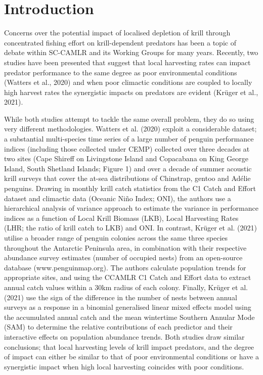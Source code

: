 \documentclass[]{elsarticle} %
\begin{document}
\hypertarget{introduction}{%
\section{Introduction}\label{introduction}}

Concerns over the potential impact of localised depletion of krill
through concentrated fishing effort on krill-dependent predators has
been a topic of debate within SC-CAMLR and its Working Groups for many
years. Recently, two studies have been presented that suggest that local
harvesting rates can impact predator performance to the same degree as
poor environmental conditions (Watters et al., 2020) and when poor
climactic conditions are coupled to locally high harvest rates the
synergistic impacts on predators are evident (Krüger et al., 2021).

While both studies attempt to tackle the same overall problem, they do
so using very different methodologies. Watters et al. (2020) exploit a
considerable dataset; a substantial multi-species time series of a large
number of penguin performance indices (including those collected under
CEMP) collected over three decades at two sites (Cape Shireff on
Livingstone Island and Copacabana on King George Island, South Shetland
Islands; Figure 1) and over a decade of summer acoustic krill surveys
that cover the at-sea distributions of Chinstrap, gentoo and Adélie
penguins. Drawing in monthly krill catch statistics from the C1 Catch
and Effort dataset and climactic data (Oceanic Niño Index; ONI), the
authors use a hierarchical analysis of variance approach to estimate the
variance in performance indices as a function of Local Krill Biomass
(LKB), Local Harvesting Rates (LHR; the ratio of krill catch to LKB) and
ONI. In contrast, Krüger et al. (2021) utilise a broader range of
penguin colonies across the same three species throughout the Antarctic
Peninsula area, in combination with their respective abundance survey
estimates (number of occupied nests) from an open-source database
(www.penguinmap.org). The authors calculate population trends for
appropriate sites, and using the CCAMLR C1 Catch and Effort data to
extract annual catch values within a 30km radius of each colony.
Finally, Krüger et al. (2021) use the sign of the difference in the
number of nests between annual surveys as a response in a binomial
generalised linear mixed effects model using the accumulated annual
catch and the mean wintertime Southern Annular Mode (SAM) to determine
the relative contributions of each predictor and their interactive
effects on population abundance trends. Both studies draw similar
conclusions; that local harvesting levels of krill impact predators, and
the degree of impact can either be similar to that of poor environmental
conditions or have a synergistic impact when high local harvesting
coincides with poor conditions.
\end{document}

